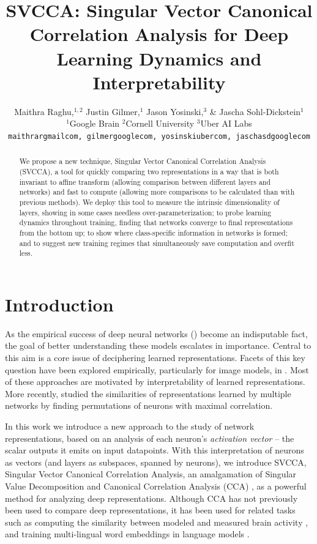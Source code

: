 \documentclass{article} %
\title{SVCCA: Singular Vector Canonical Correlation Analysis for Deep Learning Dynamics and Interpretability}
\author{Maithra Raghu,$^{1,2}$ Justin Gilmer,$^1$ Jason Yosinski,$^3$ \& Jascha Sohl-Dickstein$^1$ \\
  $^1$Google Brain  $^2$Cornell  University  $^3$Uber AI Labs \\
  \texttt{maithrar\textatsign gmail\textdot com,
  gilmer\textatsign google\textdot com,
    yosinski\textatsign uber\textdot com,
    jaschasd\textatsign google\textdot com} \\
}
\begin{document}
\maketitle

\begin{abstract}
  We propose a new technique, Singular Vector Canonical Correlation Analysis
  (SVCCA), a tool for quickly comparing two representations in a way
  that is both invariant to affine transform 
  (allowing comparison
  between different layers and networks) and fast to compute (allowing
  more comparisons to be calculated than with previous methods).  We
  deploy this tool to measure the intrinsic dimensionality of layers,
  showing in some cases needless over-parameterization; to probe
  learning dynamics throughout training, finding that networks
  converge to final representations from the bottom up; to show where
  class-specific information in networks is formed; and to suggest new
  training regimes that simultaneously save computation and overfit
  less.
\end{abstract}

\section{Introduction}

As the empirical success of deep neural networks (\cite{hinton2012deep,krizhevsky2012imagenet,wu2016google}) become an indisputable fact, the goal of better understanding these models escalates in importance. Central to this aim is a core issue of deciphering learned representations. Facets of this key question have been explored empirically, particularly for image models, in \cite{alain2016understanding,eigen2013understanding,lenc2015understanding,li2015convergent,mahendran2015understanding,montavon2011kernel,simonyan2013deep,yosinski2015understanding,zeiler2014visualizing}. Most of these approaches are motivated by interpretability of learned representations. More recently, \cite{li-2016-arXivICLR-convergent-learning:-do-different} studied the similarities of representations learned by multiple networks by finding permutations of neurons with maximal correlation. 

In this work we introduce a new approach to the study of network representations, based on an analysis of each neuron's {\em activation vector} -- the scalar outputs it emits on input datapoints. With this interpretation of neurons as vectors (and layers as subspaces, spanned by neurons), we introduce SVCCA, Singular Vector Canonical Correlation Analysis, an amalgamation of Singular Value Decomposition and Canonical Correlation Analysis (CCA) \cite{ccapaper}, as a powerful method for analyzing deep representations. 
Although CCA has not previously been used to compare deep representations, it has been used for related tasks such as 
computing the similarity between modeled and measured brain activity \cite{sussillo2015neural}, 
and training multi-lingual word embeddings in language models \cite{faruqui2014improving}.
\end{document}
